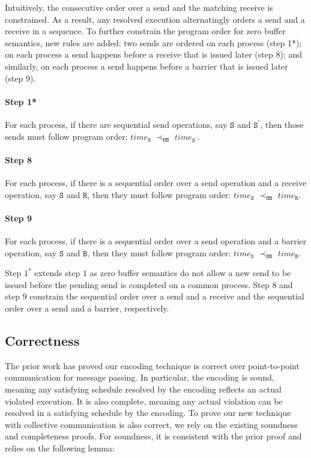 Intuitively, the consecutive order over a send and the matching receive is constrained. As a result, any resolved execution alternatingly orders a send and a receive in a sequence. To further constrain the program order for zero buffer semantics, new rules are added: two sends are ordered on each process (step 1*); on each process a send happens before a receive that is issued later (step 8); and similarly, on each process a send happens before a barrier that is issued later (step 9).

\paragraph*{Step 1*} For each process, if there are sequential send
operations, say $\mathtt{S}$ and $\mathtt{S^\prime}$, then those
sends must follow program order: $\mathit{time}_\mathtt{S}$
$\prec_\mathtt{HB}$ $\mathit{time}_\mathtt{S^\prime}$.

\paragraph*{Step 8} For each process, if there is a sequential order over a send operation and a receive operation, say $\mathtt{S}$ and $\mathtt{R}$, then they must follow program order: 
$\mathit{time}_\mathtt{S}$
$\prec_\mathtt{HB}$ $\mathit{time}_\mathtt{R}$.

\paragraph*{Step 9} For each process, if there is a sequential order over a send operation and a barrier operation, say $\mathtt{S}$ and $\mathtt{B}$, then they must follow program order: 
$\mathit{time}_\mathtt{S}$
$\prec_\mathtt{HB}$ $\mathit{time}_\mathtt{B}$.

Step $1^*$ extends step $1$ as zero buffer semantics do not allow a new send to be issued before the pending send is completed on a common process. Step $8$ and step $9$ constrain the sequential order over a send and a receive and the sequential order over a send and a barrier, respectively.

\subsection{Correctness}

The prior work \cite{DBLP:conf/kbse/HuangMM13} has proved our encoding technique is correct over point-to-point communication for message passing. In particular, the encoding is sound, meaning any satisfying schedule resolved by the encoding reflects an actual violated execution. It is also complete, meaning any actual violation can be resolved in a satisfying schedule by the encoding. To prove our new technique with collective communication is also correct, we rely on the existing soundness and completeness proofs. For soundness, it is consistent with the prior proof and relies on the following lemma: 

